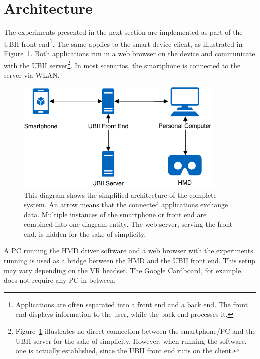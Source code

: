 \section{Architecture}\label{section:architecture}

The experiments presented in the next section are implemented as part of the \gls{UBII} front end\footnote{Applications are often separated into a front end and a back end. The front end displays information to the user, while the back end processes it.}. The same applies to the smart device client, as illustrated in Figure~\ref{fig:architecture}. Both applications run in a web browser on the device and communicate with the \gls{UBII} server\footnote{Figure~\ref{fig:architecture} illustrates no direct connection between the smartphone/\gls{PC} and the \gls{UBII} server for the sake of simplicity. However, when running the software, one is actually established, since the \gls{UBII} front end runs on the client.}. In most scenarios, the smartphone is connected to the server via \gls{WLAN}.

\begin{figure}[H]
  \centering
  \includegraphics[width=10cm]{figures/implementation/architecture.pdf}
  \caption[The system architecture]{This diagram shows the simplified architecture of the complete system. An arrow means that the connected applications exchange data. Multiple instances of the smartphone or front end are combined into one diagram entity. The web server, serving the front end, is hidden for the sake of simplicity. }\label{fig:architecture}
\end{figure}

A \gls{PC} running the \gls{HMD} driver software and a web browser with the experiments running is used as a bridge between the \gls{HMD} and the \gls{UBII} front end. This setup may vary depending on the \gls{VR} headset. The Google Cardboard, for example, does not require any \gls{PC} in between.

